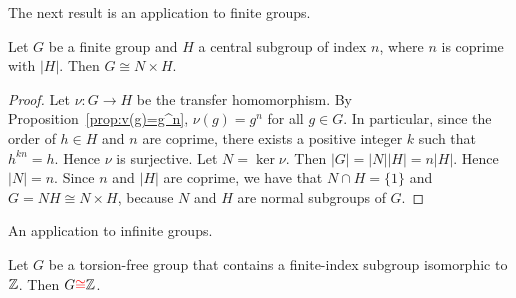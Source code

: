 The next result is an application to finite groups. 

\begin{proposition}
	\label{prop:semidirecto}
	Let $G$ be a finite group and $H$ a central subgroup of index $n$, where 
	$n$ is coprime with $|H|$. Then
	$G\cong N\times H$.
\end{proposition}

\begin{proof} Let $\nu \colon G\to H$ be the transfer homomorphism.
	 By Proposition~\ref{prop:v(g)=g^n}, 
		$\nu(g)=g^n$ for all $g\in G$. In particular, since the order of $h\in H$ and $n$ are coprime, there exists a positive integer $k$ such that $h^{kn}=h$. Hence $\nu$ is surjective. Let $N=\ker \nu$. Then $|G|=|N||H|=n|H|$. Hence $|N|=n$. Since $n$ and $|H|$ are coprime, we have that $N\cap H=\{ 1\}$ and $G=NH\cong N\times H$, because $N$ and $H$ are normal subgroups of $G$. 
\end{proof}




An application to infinite groups. 

\begin{theorem}\label{thm:Zfiniteindex}
	Let $G$ be a torsion-free group that contains a finite-index subgroup isomorphic to  
	$\mathbb{Z}$. Then $G\textcolor{red}{\cong}\mathbb{Z}$.
\end{theorem}


